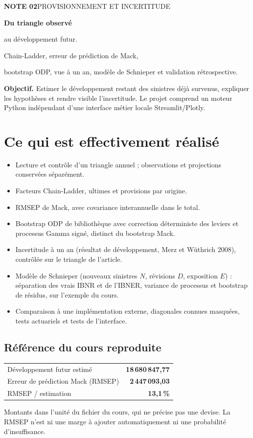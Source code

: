 \documentclass[11pt,a4paper]{article}
\newcommand{\smallnote}[1]{{\small\color{Muted}#1}}
\begin{document}
{\small\color{Muted}\textbf{NOTE 02}\quad PROVISIONNEMENT ET INCERTITUDE}
\vspace{5mm}

{\fontsize{27}{31}\selectfont\bfseries\color{Forest}Du triangle observé\par au développement futur.}

{\large Chain-Ladder, erreur de prédiction de Mack,\par bootstrap ODP, vue à un an, modèle de Schnieper et validation rétrospective.}
\vspace{3mm}

\begin{keybox}
\textbf{Objectif.} Estimer le développement restant des sinistres déjà survenus, expliquer les hypothèses et rendre visible l'incertitude. Le projet comprend un moteur Python indépendant d'une interface métier locale Streamlit/Plotly.
\end{keybox}

\section*{Ce qui est effectivement réalisé}
\begin{itemize}
\item Lecture et contrôle d'un triangle annuel ; observations et projections conservées séparément.
\item Facteurs Chain-Ladder, ultimes et provisions par origine.
\item RMSEP de Mack, avec covariance interannuelle dans le total.
\item Bootstrap ODP de bibliothèque avec correction déterministe des leviers et processus Gamma signé, distinct du bootstrap Mack.
\item Incertitude à un an (résultat de développement, Merz et Wüthrich 2008), contrôlée sur le triangle de l'article.
\item Modèle de Schnieper (nouveaux sinistres $N$, révisions $D$, exposition $E$) : séparation des vrais IBNR et de l'IBNER, variance de processus et bootstrap de résidus, sur l'exemple du cours.
\item Comparaison à une implémentation externe, diagonales connues masquées, tests actuariels et tests de l'interface.
\end{itemize}

\subsection*{Référence du cours reproduite}
\begin{center}
\begin{tabular}{lr}
\toprule
Développement futur estimé & \textbf{18\,680\,847,77} \\
Erreur de prédiction Mack (RMSEP) & \textbf{2\,447\,093,03} \\
RMSEP / estimation & \textbf{13,1\,\%} \\
\bottomrule
\end{tabular}
\end{center}
\smallnote{Montants dans l'unité du fichier du cours, qui ne précise pas une devise. La RMSEP n'est ni une marge à ajouter automatiquement ni une probabilité d'insuffisance.}
\end{document}
